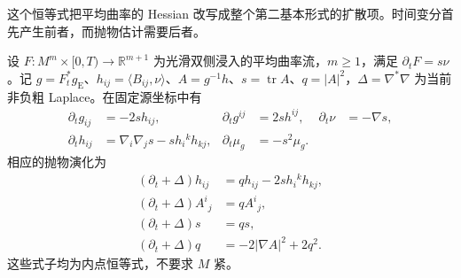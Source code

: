 这个恒等式把平均曲率的 Hessian 改写成整个第二基本形式的扩散项。时间变分首先产生前者，而抛物估计需要后者。

\begin{proposition}\label{g3:prop:mcf-hypersurface-evolution}
	设 \(F:M^m\times[0,T)\to\mathbb R^{m+1}\) 为光滑双侧浸入的平均曲率流，\(m\ge1\)，满足 \(\partial_tF=s\nu\)。记 \(g=F_t^*g_{\mathrm E}\)、\(h_{ij}=\langle B_{ij},\nu\rangle\)、\(A=g^{-1}h\)、\(s=\operatorname{tr}A\)、\(q=|A|^2\)，\(\Delta=\nabla^*\nabla\) 为当前非负粗 Laplace。在固定源坐标中有
	\begin{align}
		\partial_t g_{ij}&=-2s h_{ij},&
		\partial_t g^{ij}&=2s h^{ij},&
		\partial_t\nu&=-\nabla s,\label{g3:eq:mcf-metric-normal-evolution}\\
		\partial_t h_{ij}&=\nabla_i\nabla_j s-s h_i{}^k h_{kj},&
		\partial_t\mu_g&=-s^2\mu_g.\label{g3:eq:mcf-second-form-variation}
	\end{align}
	相应的抛物演化为
	\begin{align}
		(\partial_t+\Delta)h_{ij}&=q h_{ij}-2s h_i{}^k h_{kj},\label{g3:eq:mcf-covariant-form-evolution}\\
		(\partial_t+\Delta)A^i{}_j&=q A^i{}_j,\label{g3:eq:mcf-shape-evolution}\\
		(\partial_t+\Delta)s&=q s,\label{g3:eq:mcf-mean-evolution}\\
		(\partial_t+\Delta)q&=-2|\nabla A|^2+2q^2.\label{g3:eq:mcf-curvature-norm-evolution}
	\end{align}
	这些式子均为内点恒等式，不要求 \(M\) 紧。
\end{proposition}
